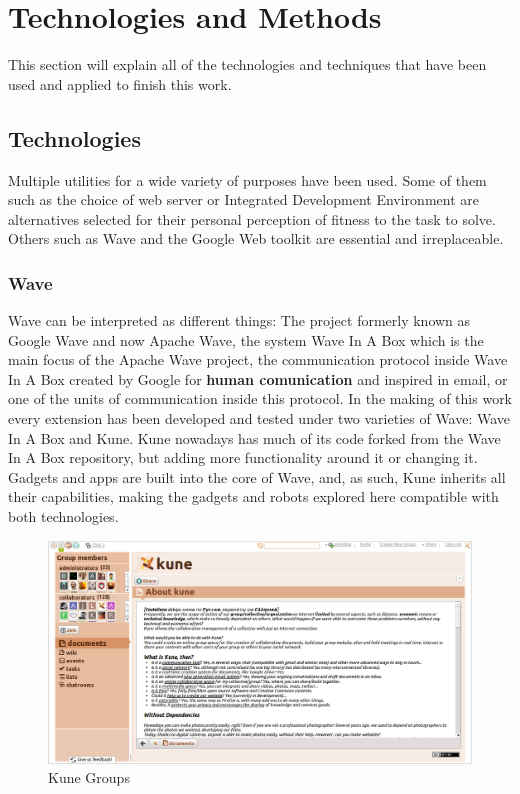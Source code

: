 \newpage
\thispagestyle{sectioned}
\section{Technologies and Methods}
This section will explain all of the technologies and techniques that have been used and applied to finish this work.
\subsection{Technologies}
Multiple utilities for a wide variety of purposes have been used. Some of them such as the choice of web server or Integrated Development Environment are alternatives selected for their personal perception of fitness to the task to solve. Others such as Wave and the Google Web toolkit are essential and irreplaceable.
\subsubsection{Wave}
Wave can be interpreted as different things: The project formerly known as Google Wave and now Apache Wave, the system Wave In A Box which is the main focus of the Apache Wave project, the communication protocol inside Wave In A Box created by Google for \textbf{human comunication} and inspired in email, or one of the units of communication inside this protocol. In the making of this work every extension has been developed and tested under two varieties of Wave: Wave In A Box and Kune. Kune nowadays has much of its code forked from the Wave In A Box repository, but adding more functionality around it or changing it. Gadgets and apps are built into the core of Wave, and, as such, Kune inherits all their capabilities, making the gadgets and robots explored here compatible with both technologies.
\begin{figure}[H]
  \center
    \includegraphics[keepaspectratio, scale=0.26]{Media/Captures/Wave/Kune_Groups.png}
  \caption{Kune Groups}
  \label{fig:kune_groups}
\end{figure}
